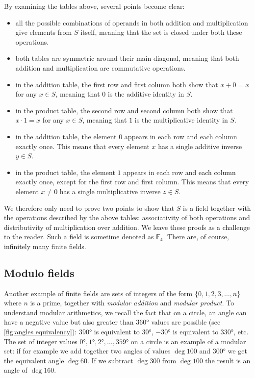 \flushleft
By examining the tables above, several points become clear:
\begin{itemize}
	\item all the possible combinations of operands in both addition and multiplication give elements from $S$ itself, meaning that the set is closed under both these operations.
	\item both tables are symmetric around their main diagonal, meaning that both addition and multiplication are commutative operations.
	\item in the addition table, the first row and first column both show that $x+0=x$ for any $x\in S$, meaning that $0$ is the additive identity in $S$.
	\item in the product table, the second row and second column both show that $x\cdot1=x$ for any $x\in S$, meaning that $1$ is the multiplicative identity in $S$.
	\item in the addition table, the element $0$ appears in each row and each column exactly once. This means that every element $x$ has a single additive inverse $y\in S$.
	\item in the product table, the element $1$ appears in each row and each column exactly once, except for the first row and first column. This means that every element $x\neq 0$ has a single multiplicative inverse $z\in S$.
\end{itemize}

We therefore only need to prove two points to show that $S$ is a field together with the operations described by the above tables: associativity of both operations and distributivity of multiplication over addition. We leave these proofs as a challenge to the reader. Such a field is sometime denoted as $\mathbb{F}_{4}$. There are, of course, infinitely many finite fields.

\subsection{Modulo fields}
Another example of finite fields are sets of integers of the form $\{0,1,2,3,\dots,n\}$ where $n$ is a prime, together with \emph{modular addition} and \emph{modular product}. To understand modular arithmetics, we recall the fact that on a circle, an angle can have a negative value but also greater than $\ang{360}$ values are possible (see \autoref{fig:angles equivalency}): $\ang{390}$ is equivalent to $\ang{30}$, $\ang{-30}$ is equivalent to $\ang{330}$, etc. The set of integer values $\ang{0},\ang{1},\ang{2},\dots,\ang{359}$ on a circle is an example of a modular set: if for example we add together two angles of values $\deg{100}$ and $\ang{300}$ we get the equivalent angle $\deg{60}$. If we subtract $\deg{300}$ from $\deg{100}$ the result is an angle of $\deg{160}$.

